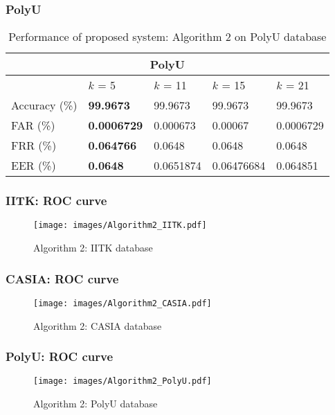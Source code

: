 \documentclass{beamer}
\begin{document}
\begin{frame}
\frametitle{PolyU}
\begin{table}[ht]
\centering 
\begin{tabular}{| l || l | l | l | l |  }
    \hline
    \multicolumn{5}{|c|}{PolyU}\\
    \hline
    \hline
		  & $k$ = 5 & $k$ = 11 & $k$ = 15 & $k$ = 21 \\ \hline
    \hline
    Accuracy (\%) & \textbf{99.9673}        & 99.9673	& 99.9673 & 99.9673  \\ \hline
    FAR (\%) 	  & \textbf{0.0006729}     & 0.000673& 0.00067 & 0.0006729  \\ \hline
    FRR (\%)      & \textbf{0.064766}        & 0.0648 	& 0.0648 & 0.0648    \\ \hline
    EER (\%)      & \textbf{0.0648}        & 0.0651874	& 0.06476684& 0.064851 \\ \hline    
\end{tabular}
 \caption{Performance of proposed system: Algorithm 2 on PolyU database\label{table:exp2_polyu}}
\end{table}
\end{frame}

\begin{frame}
\frametitle{IITK: ROC curve}
\begin{figure}
	\begin{center}
	\texttt{[image: images/Algorithm2\_IITK.pdf]}
	\caption{Algorithm 2: IITK database}
	\end{center}
	\end{figure}
\end{frame}


\begin{frame}
\frametitle{CASIA: ROC curve}
\begin{figure}
	\begin{center}
	\texttt{[image: images/Algorithm2\_CASIA.pdf]}
	\caption{Algorithm 2: CASIA database}
	\end{center}
	\end{figure}
\end{frame}


\begin{frame}
\frametitle{PolyU: ROC curve}
\begin{figure}
	\begin{center}
	\texttt{[image: images/Algorithm2\_PolyU.pdf]}
	\caption{Algorithm 2: PolyU database}
	\end{center}
	\end{figure}
\end{frame}
\end{document}
